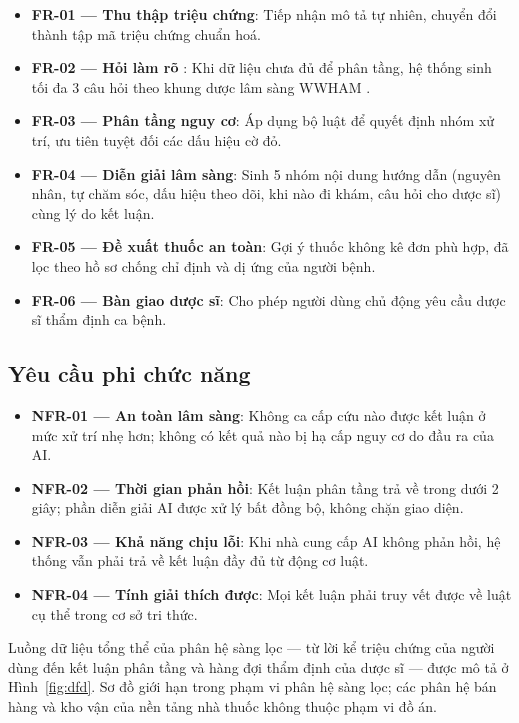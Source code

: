 \begin{itemize}[leftmargin=1.6em, itemsep=2pt]
  \item \textbf{FR-01 — Thu thập triệu chứng}: Tiếp nhận mô tả tự nhiên, chuyển
        đổi thành tập mã triệu chứng chuẩn hoá.
  \item \textbf{FR-02 — Hỏi làm rõ }: Khi dữ liệu chưa đủ để
        phân tầng, hệ thống sinh tối đa 3 câu hỏi theo khung dược lâm sàng WWHAM
        .
  \item \textbf{FR-03 — Phân tầng nguy cơ}: Áp dụng bộ luật để quyết định nhóm
        xử trí, ưu tiên tuyệt đối các dấu hiệu cờ đỏ.
  \item \textbf{FR-04 — Diễn giải lâm sàng}: Sinh 5 nhóm nội dung hướng dẫn
        (nguyên nhân, tự chăm sóc, dấu hiệu theo dõi, khi nào đi khám, câu hỏi
        cho dược sĩ) cùng lý do kết luận.
  \item \textbf{FR-05 — Đề xuất thuốc an toàn}: Gợi ý thuốc không kê đơn phù hợp,
        đã lọc theo hồ sơ chống chỉ định và dị ứng của người bệnh.
  \item \textbf{FR-06 — Bàn giao dược sĩ}: Cho phép người dùng chủ động yêu cầu
        dược sĩ thẩm định ca bệnh.
\end{itemize}

\subsection{Yêu cầu phi chức năng}

\begin{itemize}[leftmargin=1.6em, itemsep=2pt]
  \item \textbf{NFR-01 — An toàn lâm sàng}: Không ca cấp cứu nào được kết luận
        ở mức xử trí nhẹ hơn; không có kết quả nào bị hạ cấp nguy cơ do đầu ra
        của AI.
  \item \textbf{NFR-02 — Thời gian phản hồi}: Kết luận phân tầng trả về trong
        dưới 2 giây; phần diễn giải AI được xử lý bất đồng bộ, không chặn giao diện.
  \item \textbf{NFR-03 — Khả năng chịu lỗi}: Khi nhà cung cấp AI không phản hồi,
        hệ thống vẫn phải trả về kết luận đầy đủ từ động cơ luật.
  \item \textbf{NFR-04 — Tính giải thích được}: Mọi kết luận phải truy vết được
        về luật cụ thể trong cơ sở tri thức.
\end{itemize}

Luồng dữ liệu tổng thể của phân hệ sàng lọc — từ lời kể triệu chứng của người
dùng đến kết luận phân tầng và hàng đợi thẩm định của dược sĩ — được mô tả ở
Hình~\ref{fig:dfd}. Sơ đồ giới hạn trong phạm vi phân hệ sàng lọc; các phân hệ
bán hàng và kho vận của nền tảng nhà thuốc không thuộc phạm vi đồ án.

